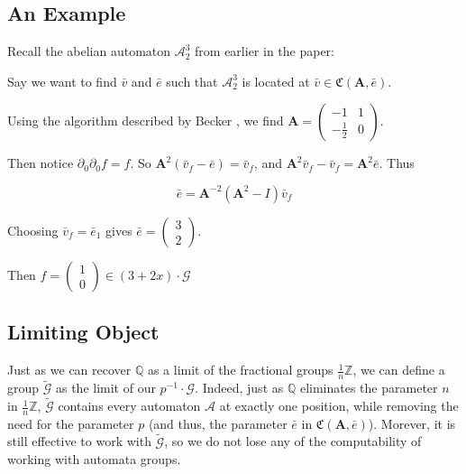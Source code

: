 \documentclass[runningheads]{llncs}
\newcommand{\A}{\mathcal{A}}
\newcommand{\G}{\mathcal{G}}
\newcommand{\C}{\mathfrak{C}(\Am,\e)}
\newcommand{\Z}{\mathbb{Z}}
\newcommand{\Q}{\mathbb{Q}}
\newcommand{\2}{\textbf{2}}
\newcommand{\Am}{\textbf{A}}
\newcommand{\del}{\partial}
\newcommand{\vv}{\bar{v}}
\newcommand{\e}{\bar{e}}
\begin{document}
\subsection{An Example}
Recall the abelian automaton $\A^3_2$ from earlier in the paper:

\begin{center}
\end{center}

Say we want to find $\vv$ and $\e$ such that $\A^3_2$ is located at 
$\vv \in \C$.

Using the algorithm described by Becker \cite{Becker18:thesis}, we find
$\Am = \begin{pmatrix} -1 & 1 \\ -\frac{1}{2} & 0 \end{pmatrix}$.

Then notice $\del_0 \del_0 f = f$.
So $\Am^2 (\vv_f - \e) = \vv_f$, and
$\Am^2 \vv_f - \vv_f = \Am^2 \e$. Thus

\[ \e = \Am^{-2} (\Am^2 - I) \vv_f \]

Choosing $\vv_f = \e_1$ gives $\e = \begin{pmatrix} 3 \\ 2 \end{pmatrix}$.

Then $f = \begin{pmatrix} 1 \\ 0 \end{pmatrix} \in (3+2x) \cdot \G$

\subsection{Limiting Object}
Just as we can recover $\Q$ as a limit of the fractional groups 
$\frac{1}{n} \Z$, we can define a group $\widetilde{\G}$ as the limit of
our $p^{-1} \cdot \G$. Indeed, just as
$\Q$ eliminates the parameter $n$ in $\frac{1}{n} \Z$, $\widetilde{\G}$ 
contains every automaton $\A$ at exactly one position, while removing the need
for the parameter $p$ (and thus, the parameter $\e$ in $\C$). Morever, it is
still effective to work with $\widetilde{\G}$, so we do not lose any of the
computability of working with automata groups.
\end{document}
